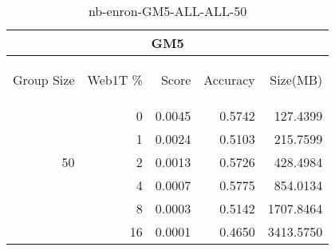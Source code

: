 \begin{center}
\begin{table}[htbp]
\begin{tabular}{ | r | r | r | r | r |}
\hline
\multicolumn{5}{|c|}{GM5}\\
\hline
\begin{sideways}Group Size\end{sideways} & \begin{sideways}Web1T \%\end{sideways} & \begin{sideways}Score\end{sideways} & \begin{sideways}Accuracy\end{sideways} & \begin{sideways}Size(MB)\end{sideways}\\
\hline
\multirow{5}{*}{50}
 & 0 & 0.0045 & 0.5742 & 127.4399\\ \cline{2-5}
 & 1 & 0.0024 & 0.5103 & 215.7599\\ \cline{2-5}
 & 2 & 0.0013 & 0.5726 & 428.4984\\ \cline{2-5}
 & 4 & 0.0007 & 0.5775 & 854.0134\\ \cline{2-5}
 & 8 & 0.0003 & 0.5142 & 1707.8464\\ \cline{2-5}
 & 16 & 0.0001 & 0.4650 & 3413.5750\\ \cline{2-5}
\hline
\end{tabular}
\caption{nb-enron-GM5-ALL-ALL-50}
\label{table:nb-enron-GM5-ALL-ALL-50}
\end{table}
\end{center}

